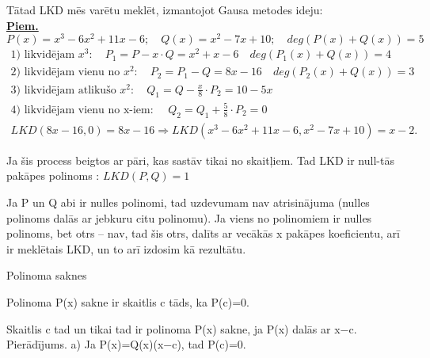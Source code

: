\documentclass[12pt]{article}
\begin{document}
Tātad LKD mēs varētu meklēt, izmantojot Gausa metodes ideju: \\
\textbf{\underline{Piem.}}  $P(x)=x^3-6x^2+11x-6; \quad Q(x)=x^2-7x+10;  \quad deg(P(x) + Q(x)) = 5$
\begin{gather*}
	\text{1) likvidējam } x^3: \quad P_1=P - x \cdot Q = x^2+x-6 \quad deg(P_1(x) + Q(x)) = 4 \\
	\text{2) likvidējam vienu no } x^2: \quad P_2 = P_1 - Q = 8x - 16 \quad deg(P_2(x) + Q(x)) = 3\\
	\text{3) likvidējam atlikušo } x^2: \quad Q_1 = Q - \frac{x}{8} \cdot P_2 = 10 - 5x \\
	\text{4) likvidējam vienu no x-iem: } \quad Q_2 = Q_1 + \frac{5}{8} \cdot P_2 = 0 \\
	LKD(8x -16, 0) = 8x - 16 \Rightarrow LKD(x^3 - 6x^2+11x-6, x^2-7x+10) = x-2.
\end{gather*}

Ja šis process beigtos ar pāri, kas sastāv tikai no skaitļiem. Tad LKD ir null-tās pakāpes polinoms :  $LKD(P, Q)=1$

Ja P un Q abi ir nulles polinomi, tad uzdevumam nav atrisinājuma (nulles polinoms
dalās ar jebkuru citu polinomu).
Ja viens no polinomiem ir nulles polinoms, bet otrs – nav, tad šis otrs, dalīts ar
vecākās x pakāpes koeficientu, arī ir meklētais LKD, un to arī izdosim kā rezultātu. 


\pagebreak
Polinoma saknes

Polinoma P(x) sakne ir skaitlis c tāds, ka P(c)=0.

Skaitlis c tad un tikai tad ir polinoma
P(x) sakne, ja P(x) dalās ar x−c.
Pierādījums.
a) Ja P(x)=Q(x)(x−c), tad P(c)=0.

\begin{gather*}
\end{gather*}
\end{document}
